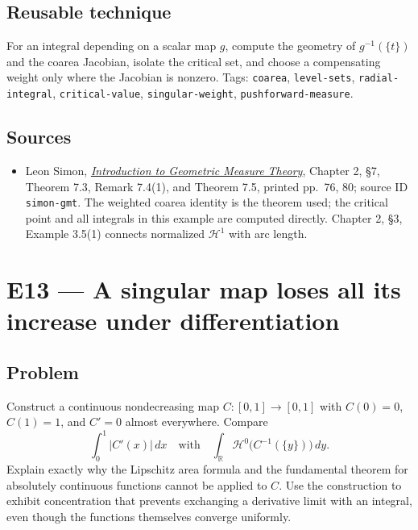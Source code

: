 \documentclass[
  11pt,
]{article}
\providecommand{\tightlist}{%
  \setlength{\itemsep}{0pt}\setlength{\parskip}{0pt}}
\begin{document}
\subsection{Reusable technique}\label{reusable-technique-11}

For an integral depending on a scalar map \(g\), compute the geometry of
\(g^{-1}(\{t\})\) and the coarea Jacobian, isolate the critical set, and
choose a compensating weight only where the Jacobian is nonzero. Tags:
\texttt{coarea}, \texttt{level-\allowbreak{}sets}, \texttt{radial-\allowbreak{}integral},
\texttt{critical-\allowbreak{}value}, \texttt{singular-\allowbreak{}weight},
\texttt{pushforward-\allowbreak{}measure}.

\subsection{Sources}\label{sources-11}

\begin{itemize}
\tightlist
\item
  Leon Simon,
  \href{https://math.stanford.edu/~lms/ntu-gmt-text.pdf}{\emph{Introduction
  to Geometric Measure Theory}}, Chapter 2, §7, Theorem 7.3, Remark
  7.4(1), and Theorem 7.5, printed pp.~76, 80; source ID
  \texttt{simon-\allowbreak{}gmt}. The weighted coarea identity is the theorem used;
  the critical point and all integrals in this example are computed
  directly. Chapter 2, §3, Example 3.5(1) connects normalized
  \(\mathcal H^1\) with arc length.
\end{itemize}

\section{E13 --- A singular map loses all its increase under
differentiation}\label{E13}

\subsection{Problem}\label{problem-12}

Construct a continuous nondecreasing map \(C:[0,1]\to[0,1]\) with
\(C(0)=0\), \(C(1)=1\), and \(C'=0\) almost everywhere. Compare \[
\int_0^1|C'(x)|\,dx
\quad\text{with}\quad
\int_{\mathbb R}\mathcal H^0\bigl(C^{-1}(\{y\})\bigr)\,dy.
\] Explain exactly why the Lipschitz area formula and the fundamental
theorem for absolutely continuous functions cannot be applied to \(C\).
Use the construction to exhibit concentration that prevents exchanging a
derivative limit with an integral, even though the functions themselves
converge uniformly.
\end{document}
